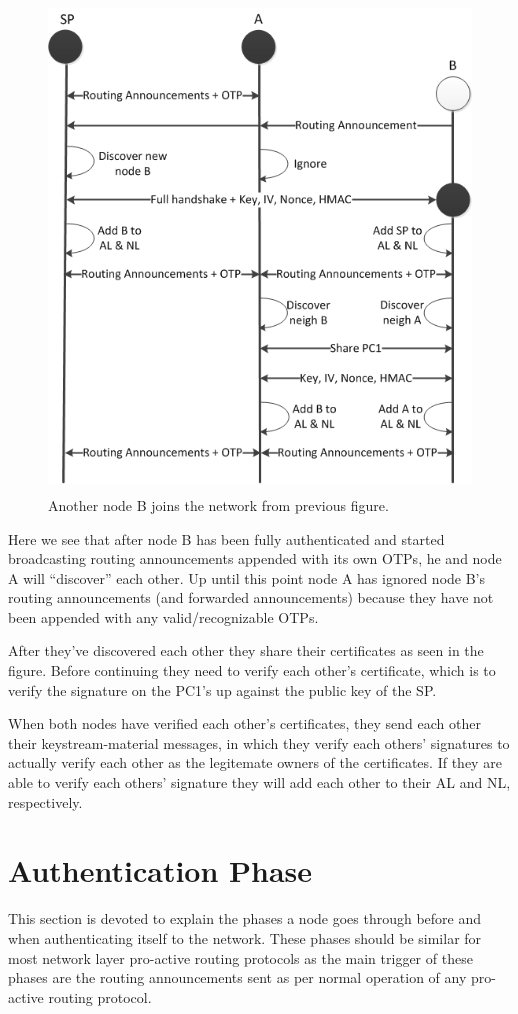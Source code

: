 \begin{figure}[h]
	\centering
  	\includegraphics[height=13cm]{images/simple_example_msc_2.png}
  	\caption{Another node B joins the network from previous figure.}
	\label{fig:simple_example_msc_2}
\end{figure}

Here we see that after node B has been fully authenticated and started
broadcasting routing announcements appended with its own \acp{OTP}, he and node
A will ``discover'' each other. Up until this point node A has ignored node B's
routing announcements (and forwarded announcements) because they have not been
appended with any valid/recognizable \acp{OTP}.

After they've discovered each other they share their certificates as seen in the
figure. Before continuing they need to verify each other's certificate, which is
to verify the signature on the \ac{PC1}'s up against the public key of the
\ac{SP}.

When both nodes have verified each other's certificates, they send each other
their keystream-material messages, in which they verify each others' signatures
to actually verify each other as the legitemate owners of the certificates. If
they are able to verify each others' signature they will add each other to their
\ac{AL} and \ac{NL}, respectively.

\section{Authentication Phase}
This section is devoted to explain the phases a node goes through before and
when authenticating itself to the network. These phases should be similar for
most network layer pro-active routing protocols as the main trigger of these
phases are the routing announcements sent as per normal operation of any
pro-active routing protocol.

